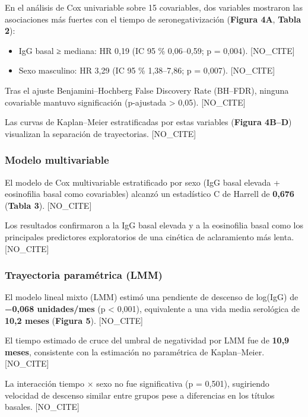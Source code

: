 \documentclass[
  spanish,
  12pt,
  a4paper,
]{article}
\providecommand{\tightlist}{%
  \setlength{\itemsep}{0pt}\setlength{\parskip}{0pt}}
\begin{document}
En el análisis de Cox univariable sobre 15 covariables, dos variables
mostraron las asociaciones más fuertes con el tiempo de
seronegativización (\textbf{Figura 4A}, \textbf{Tabla 2}):

\begin{itemize}
\tightlist
\item
  IgG basal ≥ mediana: HR 0,19 (IC 95 \% 0,06--0,59; p = 0,004).
  {[}NO\_CITE{]}
\item
  Sexo masculino: HR 3,29 (IC 95 \% 1,38--7,86; p = 0,007).
  {[}NO\_CITE{]}
\end{itemize}

Tras el ajuste Benjamini--Hochberg False Discovery Rate (BH--FDR),
ninguna covariable mantuvo significación (p-ajustada \textgreater{}
0,05). {[}NO\_CITE{]}

Las curvas de Kaplan--Meier estratificadas por estas variables
(\textbf{Figura 4B--D}) visualizan la separación de trayectorias.
{[}NO\_CITE{]}

\subsubsection{Modelo multivariable}\label{modelo-multivariable}

El modelo de Cox multivariable estratificado por sexo (IgG basal elevada
+ eosinofilia basal como covariables) alcanzó un estadístico C de
Harrell de \textbf{0,676} (\textbf{Tabla 3}). {[}NO\_CITE{]}

Los resultados confirmaron a la IgG basal elevada y a la eosinofilia
basal como los principales predictores exploratorios de una cinética de
aclaramiento más lenta. {[}NO\_CITE{]}

\subsubsection{Trayectoria paramétrica
(LMM)}\label{trayectoria-paramuxe9trica-lmm}

El modelo lineal mixto (LMM) estimó una pendiente de descenso de
log(IgG) de \textbf{−0,068 unidades/mes} (p \textless{} 0,001),
equivalente a una vida media serológica de \textbf{10,2 meses}
(\textbf{Figura 5}). {[}NO\_CITE{]}

El tiempo estimado de cruce del umbral de negatividad por LMM fue de
\textbf{10,9 meses}, consistente con la estimación no paramétrica de
Kaplan--Meier. {[}NO\_CITE{]}

La interacción tiempo × sexo no fue significativa (p = 0,501),
sugiriendo velocidad de descenso similar entre grupos pese a diferencias
en los títulos basales. {[}NO\_CITE{]}
\end{document}
